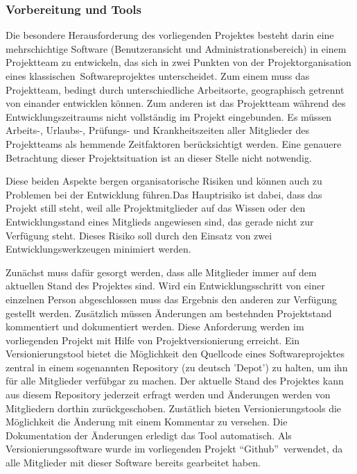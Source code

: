 \subsubsection{Vorbereitung und Tools}
\label{sec:VorbereitungUndTools}

Die besondere Herausforderung des vorliegenden Projektes besteht darin eine mehrschichtige Software (Benutzeransicht und Administrationsbereich) in einem Projektteam zu entwickeln, das sich in zwei Punkten von der Projektorganisation eines klassischen\footnotemark\ Softwareprojektes unterscheidet. Zum einem muss das Projektteam, bedingt durch unterschiedliche Arbeitsorte, geographisch getrennt von einander entwicklen können. Zum anderen ist das Projektteam während des Entwicklungszeitraums nicht vollständig im Projekt eingebunden. Es müssen Arbeits-, Urlaubs-, Prüfungs- und Krankheitszeiten aller Mitglieder des Projektteams als hemmende Zeitfaktoren berücksichtigt werden. Eine genauere Betrachtung dieser Projektsituation ist an dieser Stelle nicht notwendig.


Diese beiden Aspekte bergen organisatorische Risiken und können auch zu Problemen bei der Entwicklung führen.Das
Hauptrisiko ist dabei, dass das Projekt still steht, weil alle Projektmitglieder auf das Wissen oder den Entwicklungsstand eines Mitglieds angewiesen sind, das gerade nicht zur Verfügung steht. Dieses Risiko soll durch den Einsatz von zwei Entwicklungswerkzeugen minimiert werden.

Zunächst muss dafür gesorgt werden, dass alle Mitglieder immer auf dem aktuellen Stand des Projektes sind. Wird ein Entwicklungsschritt von einer einzelnen Person abgeschlossen muss das Ergebnis den anderen zur Verfügung gestellt werden. Zusätzlich müssen Änderungen am bestehnden Projektstand kommentiert und dokumentiert werden. Diese Anforderung werden im vorliegenden Projekt mit Hilfe von Projektversionierung erreicht. Ein Versionierungstool bietet die Möglichkeit den Quellcode eines Softwareprojektes zentral in einem sogenannten Repository (zu deutsch 'Depot') zu halten, um ihn für alle Mitglieder verfübgar zu machen. Der aktuelle Stand des Projektes kann aus diesem Repository jederzeit erfragt werden und Änderungen werden von Mitgliedern dorthin zurückgeschoben. Zustätlich bieten Versionierungstools die Möglichkeit die Änderung mit einem Kommentar zu versehen. Die Dokumentation der Änderungen erledigt das Tool automatisch. Als Versionierungssoftware wurde im vorliegenden Projekt "`Github"'\footnotemark\ verwendet, da alle Mitglieder mit dieser Software bereits gearbeitet haben.

